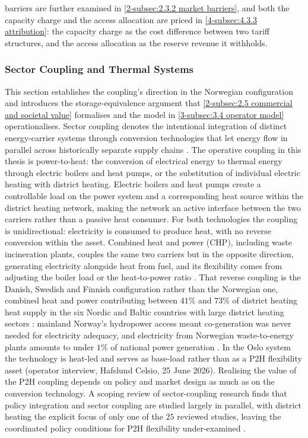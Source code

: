 barriers are further examined in \autoref{2-subsec:2.3.2 market barriers}, and both the capacity charge and the access allocation are priced in \autoref{4-subsec:4.3.3 attribution}: the capacity charge as the cost difference between two tariff structures, and the access allocation as the reserve revenue it withholds.


\subsubsection{Sector Coupling and Thermal Systems}
\label{2-subsec:2.1.3 sector coupling}

This section establishes the coupling's direction in the Norwegian configuration and introduces the storage-equivalence argument that \autoref{2-subsec:2.5 commercial and societal value} formalises and the model in \autoref{3-subsec:3.4 operator model} operationalises. Sector coupling denotes the intentional integration of distinct energy-carrier systems through conversion technologies that let energy flow in parallel across historically separate supply chains \cite{lund_smart_2017}. The operative coupling in this thesis is power-to-heat: the conversion of electrical energy to thermal energy through electric boilers and heat pumps, or the substitution of individual electric heating with district heating. Electric boilers and heat pumps create a controllable load on the power system and a corresponding heat source within the district heating network, making the network an active interface between the two carriers rather than a passive heat consumer. For both technologies the coupling is unidirectional: electricity is consumed to produce heat, with no reverse conversion within the asset. Combined heat and power (CHP), including waste incineration plants, couples the same two carriers but in the opposite direction, generating electricity alongside heat from fuel, and its flexibility comes from adjusting the boiler load or the heat-to-power ratio \cite{beiron_combined_2020}. That reverse coupling is the Danish, Swedish and Finnish configuration rather than the Norwegian one, combined heat and power contributing between $41\%$ and $73\%$ of district heating heat supply in the six Nordic and Baltic countries with large district heating sectors \cite{skytte_flexible_2019}: mainland Norway's hydropower access meant co-generation was never needed for electricity adequacy, and electricity from Norwegian waste-to-energy plants amounts to under $1\%$ of national power generation \cite{norsk_fjernvarme_fakta_nodate}. In the Oslo system the technology is heat-led and serves as base-load rather than as a P2H flexibility asset (operator interview, Hafslund Celsio, 25 June 2026). Realising the value of the P2H coupling depends on policy and market design as much as on the conversion technology. A scoping review of sector-coupling research finds that policy integration and sector coupling are studied largely in parallel, with district heating the explicit focus of only one of the $25$ reviewed studies, leaving the coordinated policy conditions for P2H flexibility under-examined \cite{vanhanen_energy_2024}.


